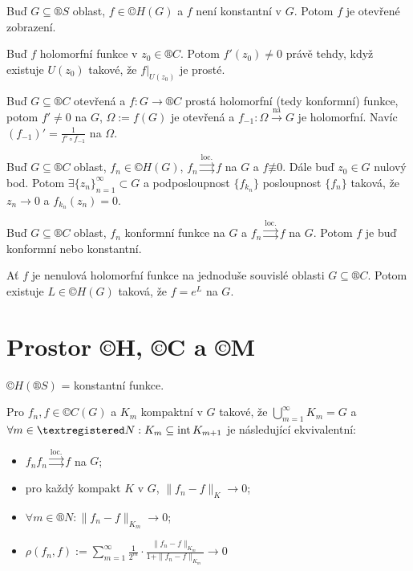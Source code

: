 \documentclass[12pt]{article}					%
\begin{document}
\begin{dusledek}
	Buď $G \subseteq ®S$ oblast, $f \in ©H(G)$ a $f$ není konstantní v $G$. Potom $f$ je otevřené zobrazení.
\end{dusledek}

\begin{dusledek}
	Buď $f$ holomorfní funkce v $z_0 \in ®C$. Potom $f'(z_0) ≠ 0$ právě tehdy, když existuje $U(z_0)$ takové, že $f|_{U(z_0)}$ je prosté.
\end{dusledek}

\begin{veta}
	Buď $G \subseteq ®C$ otevřená a $f: G \rightarrow ®C$ prostá holomorfní (tedy konformní) funkce, potom $f' ≠ 0$ na $G$, $Ω := f(G)$ je otevřená a $f_{-1}: Ω \overset{\text{na}}\rightarrow G$ je holomorfní. Navíc $(f_{-1})' = \frac{1}{f'∘f_{-1}}$ na $Ω$.
\end{veta}

\begin{veta}[Hurwitz]
	Buď $G \subseteq ®C$ oblast, $f_n \in ©H(G)$, $f_n \overset{\text{loc.}}\rightrightarrows f$ na $G$ a $f \not≡ 0$. Dále buď $z_0 \in G$ nulový bod. Potom $\exists \{z_n\}_{n=1}^∞ \subset G$ a podposloupnost $\{f_{k_n}\}$ posloupnost $\{f_n\}$ taková, že $z_n \rightarrow 0$ a $f_{k_n}(z_n) = 0$.

	\begin{dusledekin}
		Buď $G \subseteq ®C$ oblast, $f_n$ konformní funkce na $G$ a $f_n \overset{\text{loc.}}\rightrightarrows f$ na $G$. Potom $f$ je buď konformní nebo konstantní.
	\end{dusledekin}
\end{veta}

\begin{tvrzeni}
	Ať $f$ je nenulová holomorfní funkce na jednoduše souvislé oblasti $G \subseteq ®C$. Potom existuje $L \in ©H(G)$ taková, že $f = e^L$ na $G$.
\end{tvrzeni}




\section{Prostor ©H, ©C a ©M}
\begin{veta}
	$©H(®S)$ = konstantní funkce.
\end{veta}

\begin{tvrzeni}
	Pro $f_n, f \in ©C(G)$ a $K_m$ kompaktní v $G$ takové, že $\bigcup_{m=1}^∞ K_m = G$ a $\forall m \in ®N: K_m \subseteq \Int K_{m+1}$ je následující ekvivalentní:

	\begin{itemize}
		\item $f_n f_n \overset{\text{loc.}}\rightrightarrows f$ na $G$;
		\item pro každý kompakt $K$ v $G$, $\|f_n - f\|_K \rightarrow 0$;
		\item $\forall m \in ®N: \|f_n - f\|_{K_m} \rightarrow 0$;
		\item $ρ(f_n, f) := \sum_{m=1}^∞ \frac{1}{2^m}·\frac{\|f_n - f\|_{K_m}}{1 + \|f_n - f\|_{K_m}} \rightarrow 0$
	\end{itemize}
\end{tvrzeni}
\end{document}
